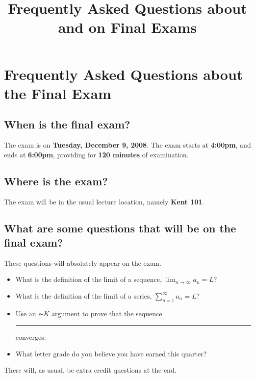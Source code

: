 \documentclass[12pt]{article}
\title{Frequently Asked Questions about and on Final Exams}
\theoremstyle{definition}
\newcommand{\limn}{\displaystyle\lim_{n \to \infty}}
\begin{document}
\renewcommand{\labelitemi}{$\qed$}

\section*{Frequently Asked Questions about the Final Exam}

\subsection*{When is the final exam?}

The exam is on \textbf{Tuesday, December 9, 2008}.  The exam starts at
\textbf{4:00pm}, and ends at \textbf{6:00pm}, providing for
\textbf{120 minutes} of examination.

\subsection*{Where is the exam?}

The exam will be in the usual lecture location, namely \textbf{Kent 101}.

\subsection*{What are some questions that will be on the final exam?}

These questions will absolutely appear on the exam.
\begin{itemize}
\item What is the definition of the limit of a sequence, $\limn a_n = L$?
\item What is the definition of the limit of a series, $\displaystyle\sum_{n=1}^\infty a_n = L$?
\item Use an $\epsilon$-$K$ argument to prove that the sequence \rule{1in}{12pt} converges.
\item What letter grade do you believe you have earned this quarter?
\end{itemize}
There will, as usual, be extra credit questions at the end.

\end{document}
